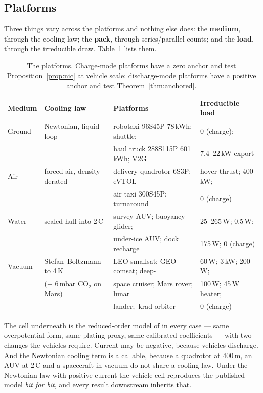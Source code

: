 \documentclass[11pt,letterpaper]{article}
\theoremstyle{definition}
\theoremstyle{remark}
\newcommand{\SI}[2]{#1\,#2}
\newcommand{\degreeCelsius}{\degC}
\newcommand{\degC}{\ifmmode{^\circ}\mathrm{C}\else\textdegree C\fi}
\begin{document}
\subsection{Platforms}

Three things vary across the platforms and nothing else does: the \textbf{medium}, through the
cooling law; the \textbf{pack}, through series/parallel counts; and the \textbf{load}, through
the irreducible draw. Table~\ref{tab:platforms} lists them.

\begin{table}[t]\centering\small
\caption{The \vPlatforms{} platforms. Charge-mode platforms have a zero anchor and test
Proposition~\ref{prop:nic} at vehicle scale; discharge-mode platforms have a positive anchor and
test Theorem~\ref{thm:anchored}.}
\label{tab:platforms}
\begin{tabular}{@{}llll@{}}
\toprule
\textbf{Medium} & \textbf{Cooling law} & \textbf{Platforms} & \textbf{Irreducible load} \\
\midrule
Ground & Newtonian, liquid loop & robotaxi 96S45P 78\,kWh; shuttle; & 0 (charge); \\
       &                        & haul truck 288S115P 601\,kWh; V2G & 7.4--22\,kW export \\
\addlinespace
Air & forced air, density-derated & delivery quadrotor 6S3P; eVTOL & hover thrust; 400\,kW; \\
    &                             & air taxi 300S45P; turnaround & 0 (charge) \\
\addlinespace
Water & sealed hull into \SI{2}{\degreeCelsius} & survey AUV; buoyancy glider; & 25--265\,W; 0.5\,W; \\
      &                             & under-ice AUV; dock recharge & 175\,W; 0 (charge) \\
\addlinespace
Vacuum & Stefan--Boltzmann to 4\,K & LEO smallsat; GEO comsat; deep- & 60\,W; 3\,kW; 200\,W; \\
       & ($+$ 6\,mbar CO$_2$ on Mars) & space cruiser; Mars rover; lunar & 100\,W; 45\,W heater; \\
       &                           & lander; \sDoseMax{}\,krad orbiter & 0 (charge) \\
\bottomrule
\end{tabular}
\end{table}

The cell underneath is the reduced-order model of \cite{krishnan2026safe} in every case --- same
overpotential form, same plating proxy, same calibrated coefficients --- with two changes the
vehicles require. Current may be negative, because vehicles discharge. And the Newtonian cooling
term is a callable, because a quadrotor at 400\,m, an AUV at \SI{2}{\degreeCelsius} and a spacecraft in
vacuum do not share a cooling law. Under the Newtonian law with positive current the vehicle
cell reproduces the published model \emph{bit for bit}, and every result downstream inherits
that.
\end{document}
